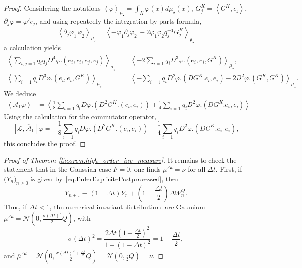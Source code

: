 \documentclass[11pt]{amsart}
\begin{document}
\begin{proof}
Considering the notations $\left\langle \varphi \right\rangle_{\mu_{\star}} =\int_{H} \varphi(x) d\mu_{\star}(x)$, $G_j^K=\left\langle G^K, e_j \right\rangle$, $\partial_j\varphi = \varphi'e_j$, and using repeatedly the integration by parts formula, 
\[
\left\langle \partial_j\varphi_1 \, \varphi_2 \right\rangle_{\mu_{\star}}
=
\left\langle -\varphi_1 \partial_j\varphi_2\, -2\varphi_1\varphi_2 q_j^{-1} G_j^K \right\rangle_{\mu_{\star}}
\]
a calculation yields
$$
\begin{aligned}
\left\langle \sum_{i,j=1} q_i q_j D^4 \varphi.(e_i,e_i,e_j,e_j) \right\rangle_{\mu_{\star}} &= \left\langle -2\sum_{i=1} q_i D^3\varphi.(e_i,e_i,G^K) \right\rangle_{\mu_{\star}},\\
\left\langle \sum_{i=1} q_i D^3 \varphi.(e_i, e_i,G^K) \right\rangle_{\mu_{\star}} &= 
\left\langle -\sum_{i=1} q_i D^2 \varphi.(DG^K.e_i,e_i)-2 D^2 \varphi.(G^K,G^K) \right\rangle_{\mu_{\star}}.
\end{aligned}
$$
We deduce
$$
\begin{aligned}
\left\langle\mathcal A_{1}\varphi \right\rangle&=
\left\langle
\frac18 \sum_{i=1} q_i D\varphi.(D^2G^K.(e_i,e_i)) + \frac14\sum_{i=1} q_iD^2\varphi.(DG^K.e_i,e_i)
\right\rangle
\end{aligned}
$$
Using the calculation for the commutator operator,
$$
[\mathcal L, \overline{\mathcal{A}}_{1}] \varphi = 
-\frac18 \sum_{i=1} q_i D\varphi.(D^2G^K.(e_i,e_i)) - \frac14\sum_{i=1} q_iD^2\varphi.(DG^K.e_i,e_i),
$$
this concludes the proof.
\end{proof}


\begin{proof}[Proof of Theorem \ref{theorem:high_order_inv_measure}]
It remains to check the statement that in the Gaussian case $F=0$, one finds $\overline{\mu}^{\Delta t}=\nu$ for all $\Delta t$. First, if $\bigl(Y_n\bigr)_{n\ge 0}$ is given by~\eqref{eq:EulerExplicitePostprocessed}, then
\[
Y_{n+1}=(1-\Delta t)Y_n+(1-\frac{\Delta t}{2})\Delta W_n^Q.
\]
Thus, if $\Delta t<1$, the numerical invariant distributions are Gaussian: $\mu^{\Delta t}=\mathcal{N}(0,\frac{\sigma(\Delta t)^2}{2}Q)$, with
\[
\sigma(\Delta t)^2=\frac{2\Delta t(1-\frac{\Delta t}{2})^2}{1-(1-\Delta t)^2}=1-\frac{\Delta t}{2},
\]
and $\overline{\mu}^{\Delta t}=\mathcal{N}(0,\frac{\sigma(\Delta t)^2+\frac{\Delta t}{2}}{2}Q)=\mathcal{N}(0,\frac12 Q)=\nu$.
\end{proof}
\end{document}
